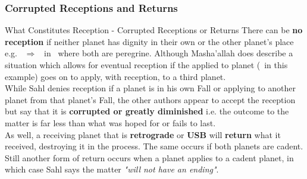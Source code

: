 \subsubsection{Corrupted Receptions and Returns}
\begin{frame}[t]{What Constitutes Reception - Corrupted Receptions or Returns}
There can be \textbf{no reception} if neither planet has dignity in their own or the other planet's place e.g. \Mercury\ $\Rightarrow$ \Jupiter\ in \Taurus\ where both are peregrine. Although Masha'allah does describe a situation which allows for eventual reception if the applied to planet (\Jupiter\ in this example) goes on to apply, with reception, to a third planet.\\
\vspace{0.25cm}
While Sahl denies reception if a planet is in his own Fall or applying to another planet from that planet's Fall, the other authors appear to accept the reception but say that it is \textbf{corrupted or greatly diminished} i.e. the outcome to the matter is far less than what was hoped for or fails to last.\\
\vspace{0.25cm}
As well, a receiving planet that is \textbf{retrograde} or \textbf{USB} will \textbf{return} what it received, destroying it in the process. The same occurs if both planets are cadent.\footnotemark[1] \\
\vspace{0.25cm}
Still another form of return occurs when a planet applies to a cadent planet, in which case Sahl says the matter \textsl{"will not have an ending"}.

\end{frame}
